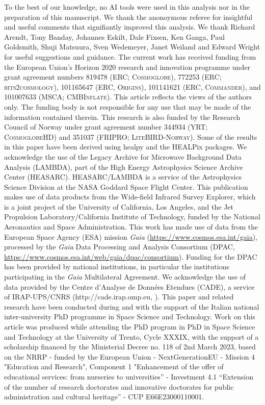 \documentclass{aa}
\begin{document}
\begin{acknowledgements}
  To the best of our knowledge, no AI tools were used in this analysis nor in the preparation of this manuscript.
  We thank the anonoymous referee for insightful and useful comments that signifiantly improved this analysis.
  We thank {Richard Arendt}, Tony Banday, Johannes Eskilt, Dale Fixsen, Ken Ganga, Paul
  Goldsmith, Shuji Matsuura, Sven Wedemeyer, Janet Weiland and {Edward Wright} for
  useful suggestions and guidance.  The current work has received
  funding from the European Union’s Horizon 2020 research and
  innovation programme under grant agreement numbers 819478 (ERC;
  \textsc{Cosmoglobe}), 772253 (ERC; \textsc{bits2cosmology}),
  {101165647 (ERC, \textsc{Origins}), 101141621 (ERC,
  \textsc{Commander}), and 101007633 (MSCA; \textsc{CMBInflate}).
  This article reflects the views of the authors only. The funding
  body is not responsible for any use that may be made of the
  information contained therein. This research is also funded by the
  Research Council of Norway under grant agreement number 344934 (YRT;
  \textsc{CosmoglobeHD}) and 351037 (FRIPRO; \textsc{LiteBIRD-Norway}).}
  Some of the results in this paper have been
  derived using healpy \citep{Zonca2019} and the HEALPix
  \citep{healpix} packages.  We acknowledge the use of the Legacy
  Archive for Microwave Background Data Analysis (LAMBDA), part of the
  High Energy Astrophysics Science Archive Center
  (HEASARC). HEASARC/LAMBDA is a service of the Astrophysics Science
  Division at the NASA Goddard Space Flight Center. This publication
  makes use of data products from the Wide-field Infrared Survey
  Explorer, which is a joint project of the University of California,
  Los Angeles, and the Jet Propulsion Laboratory/California Institute
  of Technology, funded by the National Aeronautics and Space
  Administration. This work has made use of data from the European
  Space Agency (ESA) mission {\it Gaia}
  (\url{https://www.cosmos.esa.int/gaia}), processed by the {\it Gaia}
  Data Processing and Analysis Consortium (DPAC,
  \url{https://www.cosmos.esa.int/web/gaia/dpac/consortium}). Funding
  for the DPAC has been provided by national institutions, in
  particular the institutions participating in the {\it Gaia}
  Multilateral Agreement.  We acknowledge the use of data provided by
  the Centre d'Analyse de Données Etendues (CADE), a service of
  IRAP-UPS/CNRS (http://cade.irap.omp.eu, \citealt{paradis:2012}).
  This paper and related research have been conducted during and with the support of the Italian national inter-university PhD programme in Space Science and Technology. Work on this article was produced while attending the PhD program in PhD in Space Science and Technology at the University of Trento, Cycle XXXIX, with the support of a scholarship financed by the Ministerial Decree no. 118 of 2nd March 2023, based on the NRRP - funded by the European Union - NextGenerationEU - Mission 4 "Education and Research", Component 1 "Enhancement of the offer of educational services: from nurseries to universities” - Investment 4.1 “Extension of the number of research doctorates and innovative doctorates for public administration and cultural heritage” - CUP E66E23000110001.
\end{acknowledgements}
\end{document}
